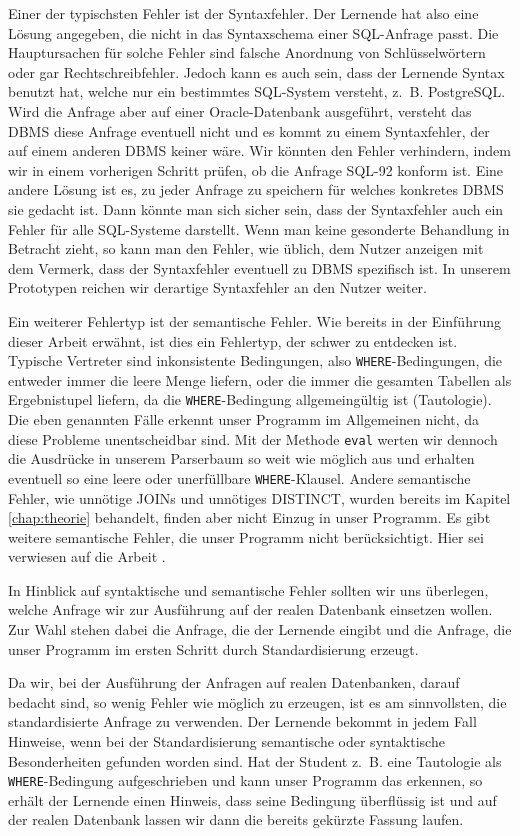 Einer der typischsten Fehler ist der Syntaxfehler. Der Lernende hat also eine Lösung angegeben, die nicht in das Syntaxschema einer SQL-Anfrage passt. Die Hauptursachen für solche Fehler sind falsche Anordnung von Schlüsselwörtern oder gar Rechtschreibfehler. Jedoch kann es auch sein, dass der Lernende Syntax benutzt hat, welche nur ein bestimmtes SQL-System versteht, \mbox{z. B.} PostgreSQL. Wird die Anfrage aber auf einer Oracle-Datenbank ausgeführt, versteht das DBMS diese Anfrage eventuell nicht und es kommt zu einem Syntaxfehler, der auf einem anderen DBMS keiner wäre. Wir könnten den Fehler verhindern, indem wir in einem vorherigen Schritt prüfen, ob die Anfrage SQL-92 konform ist. Eine andere Lösung ist es, zu jeder Anfrage zu speichern für welches konkretes DBMS sie gedacht ist. Dann könnte man sich sicher sein, dass der Syntaxfehler auch ein Fehler für alle SQL-Systeme darstellt. Wenn man keine gesonderte Behandlung in Betracht zieht, so kann man den Fehler, wie üblich, dem Nutzer anzeigen mit dem Vermerk, dass der Syntaxfehler eventuell zu DBMS spezifisch ist. In unserem Prototypen reichen wir derartige Syntaxfehler an den Nutzer weiter.

Ein weiterer Fehlertyp ist der semantische Fehler. Wie bereits in der Einführung dieser Arbeit erwähnt, ist dies ein Fehlertyp, der schwer zu entdecken ist. Typische Vertreter sind inkonsistente Bedingungen, also \verb|WHERE|-Bedingungen, die entweder immer die leere Menge liefern, oder die immer die gesamten Tabellen als Ergebnistupel liefern, da die \verb|WHERE|-Bedingung allgemeingültig ist (Tautologie). Die eben genannten Fälle erkennt unser Programm im Allgemeinen nicht, da diese Probleme unentscheidbar sind. Mit der Methode \verb|eval| werten wir dennoch die Ausdrücke in unserem Parserbaum so weit wie möglich aus und erhalten eventuell so eine leere oder unerfüllbare \verb|WHERE|-Klausel. Andere semantische Fehler, wie unnötige JOINs und unnötiges DISTINCT, wurden bereits im Kapitel \ref{chap:theorie} behandelt, finden aber nicht Einzug in unser Programm. Es gibt weitere semantische Fehler, die unser Programm nicht berücksichtigt. Hier sei verwiesen auf die Arbeit \cite{brass2}. 

In Hinblick auf syntaktische und semantische Fehler sollten wir uns überlegen, welche Anfrage wir zur Ausführung auf der realen Datenbank einsetzen wollen. Zur Wahl stehen dabei die Anfrage, die der Lernende eingibt und die Anfrage, die unser Programm im ersten Schritt durch Standardisierung erzeugt. 

Da wir, bei der Ausführung der Anfragen auf realen Datenbanken, darauf bedacht sind, so wenig Fehler wie möglich zu erzeugen, ist es am sinnvollsten, die standardisierte Anfrage zu verwenden. Der Lernende bekommt in jedem Fall Hinweise, wenn bei der Standardisierung semantische oder syntaktische Besonderheiten gefunden worden sind. Hat der Student \mbox{z. B.} eine Tautologie als \verb|WHERE|-Bedingung aufgeschrieben und kann unser Programm das erkennen, so erhält der Lernende einen Hinweis, dass seine Bedingung überflüssig ist und auf der realen Datenbank lassen wir dann die bereits gekürzte Fassung laufen. 

